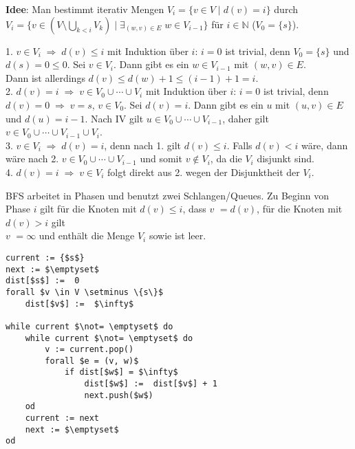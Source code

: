 \textbf{Idee}:
Man bestimmt iterativ Mengen $V_i = \{v \in V \;|\; d(v) = i\}$ durch \\
$V_i = \{v \in (V \setminus \bigcup_{k < i} V_k) \;|\;
\exists_{(w,v) \in E}\; w \in V_{i-1}\}$ für $i \in \mathbb{N}$
($V_0 = \{s\}$).

\begin{Beweis}
    1. $v \in V_i \;\Rightarrow\; d(v) \le i$ mit Induktion über $i$:
    $i = 0$ ist trivial, denn $V_0 = \{s\}$ und $d(s) = 0 \le 0$.
    Sei $v \in V_i$.
    Dann gibt es ein $w \in V_{i-1}$ mit $(w, v) \in E$. \\
    Dann ist allerdings $d(v) \le d(w) + 1 \le (i - 1) + 1 = i$. \\
    2. $d(v) = i \;\Rightarrow\; v \in V_0 \cup \dotsb \cup V_i$ mit Induktion
    über $i$:
    $i = 0$ ist trivial, denn $d(v) = 0 \;\Rightarrow\; v = s$, $v \in V_0$.
    Sei $d(v) = i$.
    Dann gibt es ein $u$ mit $(u, v) \in E$ und $d(u) = i - 1$.
    Nach IV gilt $u \in V_0 \cup \dotsb \cup V_{i-1}$, daher gilt
    $v \in V_0 \cup \dotsb \cup V_{i-1} \cup V_i$. \\
    3. $v \in V_i \;\Rightarrow\; d(v) = i$, denn nach 1. gilt
    $d(v) \le i$. Falls $d(v) < i$ wäre, dann wäre nach 2.
    $v \in V_0 \cup \dotsb \cup V_{i-1}$ und somit $v \notin V_i$,
    da die $V_i$ disjunkt sind. \\
    4. $d(v) = i \;\Rightarrow\; v \in V_i$ folgt direkt aus 2. wegen der
    Disjunktheit der $V_i$.
\end{Beweis}

\linie

BFS arbeitet in Phasen und benutzt zwei Schlangen/Queues.
Zu Beginn von Phase $i$ gilt für die Knoten mit $d(v) \le i$, dass
\code{dist[}$v$\code{]} $= d(v)$, für die Knoten mit $d(v) > i$ gilt \\
\code{dist[}$v$\code{]} $= \infty$ und  enthält die Menge
$V_i$ sowie  ist leer.

\begin{lstlisting}
current := {$s$}
next := $\emptyset$
dist[$s$] :=  0
forall $v \in V \setminus \{s\}$
    dist[$v$] :=  $\infty$

while current $\not= \emptyset$ do
    while current $\not= \emptyset$ do
        v := current.pop()
        forall $e = (v, w)$
            if dist[$w$] = $\infty$
                dist[$w$] :=  dist[$v$] + 1
                next.push($w$)
    od
    current := next
    next := $\emptyset$
od
\end{lstlisting}

